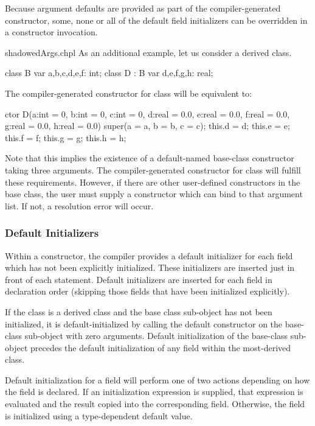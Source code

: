 Because argument defaults are provided as part of the compiler-generated
constructor, some, none or all of the default field initializers can be
overridden in a constructor invocation.

\begin{chapelexample}{shadowedArgs.chpl}
As an additional example, let us consider a derived class.
\begin{chapel}
class B {
  var a,b,c,d,e,f: int;
}
class D : B {
  var d,e,f,g,h: real;
}
\end{chapel}
The compiler-generated constructor for class  will be equivalent to:
\begin{chapel}
ctor D(a:int = 0, b:int = 0, c:int = 0, 
       d:real = 0.0, e:real = 0.0, f:real = 0.0, 
       g:real = 0.0, h:real = 0.0)
{ super(a = a, b = b, c = c);
  this.d = d; this.e = e; this.f = f; this.g = g; this.h = h; }
\end{chapel}
Note that this implies the existence of a default-named base-class constructor
taking three arguments.  The compiler-generated constructor for class  will fulfill these
requirements.  However, if there are other user-defined constructors
in the base class, the user must supply a constructor which can bind to that
argument list.  If not, a resolution error will occur.
\end{chapelexample}

\subsubsection{Default Initializers}
\label{Default_Initializers}

Within a constructor, the compiler provides a default initializer for each field
which has not been explicitly initialized.  These initializers are inserted just
in front of each  statement.  Default initializers are inserted for
each field in declaration order (skipping those fields that have been
initialized explicitly).  

If the class is a derived class and the base class sub-object has not been
initialized, it is default-initialized by calling the default constructor on the
base-class sub-object with zero arguments.  Default initialization of the
base-class sub-object precedes the default initialization of any field within
the most-derived class.

Default initialization for a field will perform one of two actions depending on
how the field is declared.  If an initialization expression is supplied, that
expression is evaluated and the result copied into the corresponding field.
Otherwise, the field is initialized using a type-dependent default
value.

